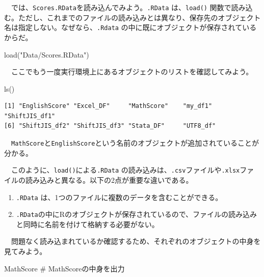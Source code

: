 \documentclass[
  a4paper,
  pandoc,
  ja=standard,
  jafont=haranoaji]{bxjsbook}
\newenvironment{Shaded}{\begin{snugshade}}{\end{snugshade}}
\newcommand{\CommentTok}[1]{\textcolor[rgb]{0.37,0.37,0.37}{#1}}
\newcommand{\FunctionTok}[1]{\textcolor[rgb]{0.28,0.35,0.67}{#1}}
\newcommand{\NormalTok}[1]{\textcolor[rgb]{0.00,0.48,0.65}{#1}}
\newcommand{\StringTok}[1]{\textcolor[rgb]{0.13,0.47,0.30}{#1}}
\providecommand{\tightlist}{%
  \setlength{\itemsep}{0pt}\setlength{\parskip}{0pt}}
\begin{document}
　では、\texttt{Scores.RData}を読み込んでみよう。\texttt{.RData}
は、\texttt{load()}
関数で読み込む。ただし、これまでのファイルの読み込みとは異なり、保存先のオブジェクト名は指定しない。なぜなら、\texttt{.Rdata}
の中に既にオブジェクトが保存されているからだ。

\begin{Shaded}
\begin{Highlighting}[numbers=left,,]
\FunctionTok{load}\NormalTok{(}\StringTok{"Data/Scores.RData"}\NormalTok{)}
\end{Highlighting}
\end{Shaded}

　ここでもう一度実行環境上にあるオブジェクトのリストを確認してみよう。

\begin{Shaded}
\begin{Highlighting}[numbers=left,,]
\FunctionTok{ls}\NormalTok{()}
\end{Highlighting}
\end{Shaded}

\begin{verbatim}
[1] "EnglishScore" "Excel_DF"     "MathScore"    "my_df1"       "ShiftJIS_df1"
[6] "ShiftJIS_df2" "ShiftJIS_df3" "Stata_DF"     "UTF8_df"     
\end{verbatim}

　\texttt{MathScore}と\texttt{EnglishScore}という名前のオブジェクトが追加されていることが分かる。

　このように、\texttt{load()}による\texttt{.RData}
の読み込みは、\texttt{.csv}ファイルや\texttt{.xlsx}ファイルの読み込みと異なる。以下の2点が重要な違いである。

\begin{enumerate}
\def\labelenumi{\arabic{enumi}.}
\tightlist
\item
  \texttt{.RData} は、1つのファイルに複数のデータを含むことができる。
\item
  \texttt{.RData}の中にRのオブジェクトが保存されているので、ファイルの読み込みと同時に名前を付けて格納する必要がない。
\end{enumerate}

　問題なく読み込まれているか確認するため、それぞれのオブジェクトの中身を見てみよう。

\begin{Shaded}
\begin{Highlighting}[numbers=left,,]
\NormalTok{MathScore }\CommentTok{\# MathScoreの中身を出力}
\end{Highlighting}
\end{Shaded}
\end{document}
